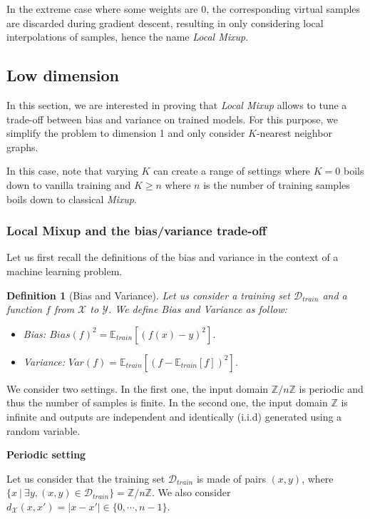 \documentclass[twoside]{article}
\numberwithin{intassumption}{assumption}
\newtheorem{definition}{Definition}[section]
\begin{document}
In the extreme case where some weights are 0, the corresponding virtual samples are discarded during gradient descent, resulting in only considering local interpolations of samples, hence the name \emph{Local Mixup}.

\subsection{Low dimension}

In this section, we are interested in proving that \emph{Local Mixup} allows to tune a trade-off between bias and variance on trained models. For this purpose, we simplify the problem to dimension 1 and only consider $K$-nearest neighbor graphs.

In this case, note that varying $K$ can create a range of settings where $K=0$ boils down to vanilla training and $K \geq n$ where $n$ is the number of training samples boils down to classical \emph{Mixup}.

\subsubsection{Local Mixup and the bias/variance trade-off}

Let us first recall the definitions of the bias and variance in the context of a machine learning problem.

\begin{definition}[Bias and Variance] Let us consider a training set $\mathcal{D}_{train}$ and a function $f$ from $\mathcal{X}$ to $\mathcal{Y}$. We define Bias and Variance as follow:
\begin{itemize}
    \item \emph{Bias}: $Bias(f)^2 = \mathbb{E}_{train}[(f(x)-y)^2]$.
    \item \emph{Variance}: $Var(f)= \mathbb{E}_{train} [(f-\mathbb{E}_{train}[f])^2]$.
\end{itemize}
\end{definition}

We consider two settings. In the first one, the input domain $\mathbb{Z}/n\mathbb{Z}$ is periodic and thus the number of samples is finite. In the second one, the input domain $\mathbb{Z}$ is infinite and outputs are independent and identically (i.i.d) generated using a random variable.
\newline 

\textbf{Periodic setting}

Let us consider that the training set $\mathcal{D}_{train}$ is made of pairs $(x,y)$, where $\{x \ \vert \ \exists y, (x,y) \in \mathcal{D}_{train}\} = \mathbb{Z}/n\mathbb{Z}$. We also consider $d_\mathcal{X}(x, x') = |x - x'| \in \{0,\cdots,n-1\}$.
\end{document}
